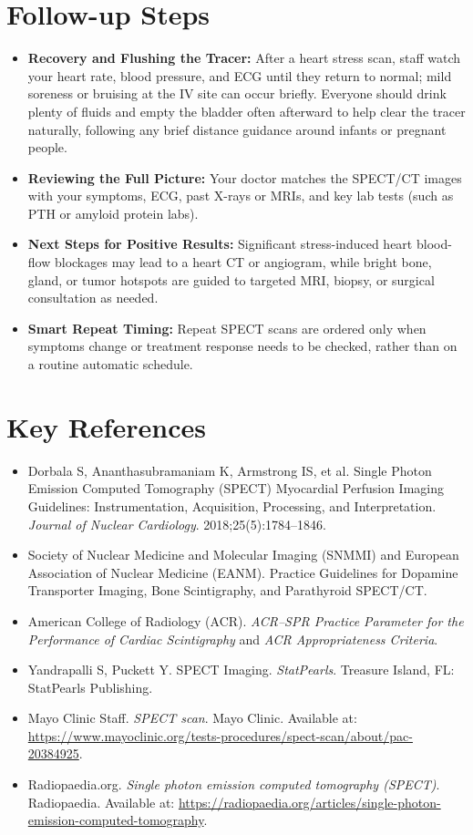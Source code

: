 \section{Follow-up Steps}

\begin{itemize}
    \item \textbf{Recovery and Flushing the Tracer:} After a heart stress scan, staff watch your heart rate, blood pressure, and ECG until they return to normal; mild soreness or bruising at the IV site can occur briefly. Everyone should drink plenty of fluids and empty the bladder often afterward to help clear the tracer naturally, following any brief distance guidance around infants or pregnant people.
    \item \textbf{Reviewing the Full Picture:} Your doctor matches the SPECT/CT images with your symptoms, ECG, past X-rays or MRIs, and key lab tests (such as PTH or amyloid protein labs).
    \item \textbf{Next Steps for Positive Results:} Significant stress-induced heart blood-flow blockages may lead to a heart CT or angiogram, while bright bone, gland, or tumor hotspots are guided to targeted MRI, biopsy, or surgical consultation as needed.
    \item \textbf{Smart Repeat Timing:} Repeat SPECT scans are ordered only when symptoms change or treatment response needs to be checked, rather than on a routine automatic schedule.
\end{itemize}

\section{Key References}

\begin{itemize}
    \item Dorbala S, Ananthasubramaniam K, Armstrong IS, et al. Single Photon Emission Computed Tomography (SPECT) Myocardial Perfusion Imaging Guidelines: Instrumentation, Acquisition, Processing, and Interpretation. \textit{Journal of Nuclear Cardiology}. 2018;25(5):1784--1846.
    \item Society of Nuclear Medicine and Molecular Imaging (SNMMI) and European Association of Nuclear Medicine (EANM). Practice Guidelines for Dopamine Transporter Imaging, Bone Scintigraphy, and Parathyroid SPECT/CT.
    \item American College of Radiology (ACR). \textit{ACR--SPR Practice Parameter for the Performance of Cardiac Scintigraphy} and \textit{ACR Appropriateness Criteria}.
    \item Yandrapalli S, Puckett Y. SPECT Imaging. \textit{StatPearls}. Treasure Island, FL: StatPearls Publishing.
    \item Mayo Clinic Staff. \textit{SPECT scan}. Mayo Clinic. Available at: \url{https://www.mayoclinic.org/tests-procedures/spect-scan/about/pac-20384925}.
    \item Radiopaedia.org. \textit{Single photon emission computed tomography (SPECT)}. Radiopaedia. Available at: \url{https://radiopaedia.org/articles/single-photon-emission-computed-tomography}.
\end{itemize}

